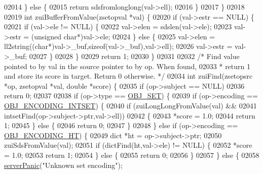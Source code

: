 \begin{DoxyCode}
02014     \} \textcolor{keywordflow}{else} \{
02015         \textcolor{keywordflow}{return} sdsfromlonglong(val->ell);
02016     \}
02017 \}
02018 
02019 \textcolor{keywordtype}{int} zuiBufferFromValue(zsetopval *val) \{
02020     \textcolor{keywordflow}{if} (val->estr == NULL) \{
02021         \textcolor{keywordflow}{if} (val->ele != NULL) \{
02022             val->elen = sdslen(val->ele);
02023             val->estr = (\textcolor{keywordtype}{unsigned} \textcolor{keywordtype}{char}*)val->ele;
02024         \} \textcolor{keywordflow}{else} \{
02025             val->elen = ll2string((\textcolor{keywordtype}{char}*)val->\_buf,\textcolor{keyword}{sizeof}(val->\_buf),val->ell);
02026             val->estr = val->\_buf;
02027         \}
02028     \}
02029     \textcolor{keywordflow}{return} 1;
02030 \}
02031 
02032 \textcolor{comment}{/* Find value pointed to by val in the source pointer to by op. When found,}
02033 \textcolor{comment}{ * return 1 and store its score in target. Return 0 otherwise. */}
02034 \textcolor{keywordtype}{int} zuiFind(zsetopsrc *op, zsetopval *val, \textcolor{keywordtype}{double} *score) \{
02035     \textcolor{keywordflow}{if} (op->subject == NULL)
02036         \textcolor{keywordflow}{return} 0;
02037 
02038     \textcolor{keywordflow}{if} (op->type == \hyperlink{server_8h_a8d179375a4aac33d3fa7aa80c8ccc75f}{OBJ\_SET}) \{
02039         \textcolor{keywordflow}{if} (op->encoding == \hyperlink{server_8h_a214173987de21c3b7661fddd42b05873}{OBJ\_ENCODING\_INTSET}) \{
02040             \textcolor{keywordflow}{if} (zuiLongLongFromValue(val) &&
02041                 intsetFind(op->subject->ptr,val->ell))
02042             \{
02043                 *score = 1.0;
02044                 \textcolor{keywordflow}{return} 1;
02045             \} \textcolor{keywordflow}{else} \{
02046                 \textcolor{keywordflow}{return} 0;
02047             \}
02048         \} \textcolor{keywordflow}{else} \textcolor{keywordflow}{if} (op->encoding == \hyperlink{server_8h_a9c10219f68afc557d510d108257d238b}{OBJ\_ENCODING\_HT}) \{
02049             dict *ht = op->subject->ptr;
02050             zuiSdsFromValue(val);
02051             \textcolor{keywordflow}{if} (dictFind(ht,val->ele) != NULL) \{
02052                 *score = 1.0;
02053                 \textcolor{keywordflow}{return} 1;
02054             \} \textcolor{keywordflow}{else} \{
02055                 \textcolor{keywordflow}{return} 0;
02056             \}
02057         \} \textcolor{keywordflow}{else} \{
02058             \hyperlink{server_8h_a11cc378e7778a830b41240578de3b204}{serverPanic}(\textcolor{stringliteral}{"Unknown set encoding"});

\end{DoxyCode}
